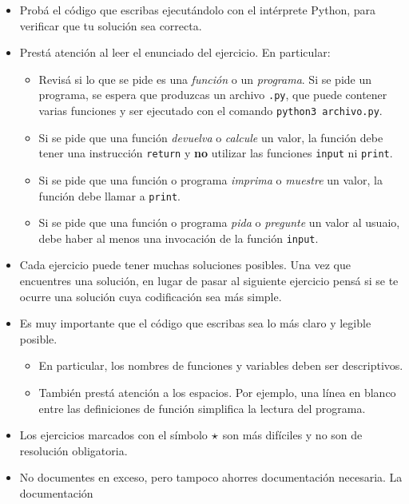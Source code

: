 \documentclass[11pt,spanish,a4paper,twoside,openany]{book}
\newcommand{\dificil}{\mathlarger{\mathlarger{\star}}}
\theoremstyle{definition}
\theoremstyle{definition}
\theoremstyle{remark}
\begin{document}
\begin{extract}
\begin{itemize}
	\item Probá el código que escribas ejecutándolo con el intérprete Python,
        para verificar que tu solución sea correcta.
	\item Prestá atención al leer el enunciado del ejercicio. En particular:
    \begin{itemize}
        \item Revisá si lo que se pide es una \emph{función} o un
            \emph{programa}. Si se pide un programa, se espera que produzcas
            un archivo \verb|.py|, que puede contener varias
            funciones y ser ejecutado con el comando \verb|python3 archivo.py|.
        \item Si se pide que una función \emph{devuelva} o \emph{calcule}
            un valor, la función debe tener una instrucción
            \verb|return| y {\bf no} utilizar las funciones \verb|input| ni
            \verb|print|.
        \item Si se pide que una función o programa \emph{imprima} o
            \emph{muestre} un valor, la función debe llamar a \verb|print|.
        \item Si se pide que una función o programa \emph{pida} o
            \emph{pregunte} un valor al usuaio, debe haber al menos una
            invocación de la función \verb|input|.
    \end{itemize}
    \item Cada ejercicio puede tener muchas soluciones posibles. Una vez que
        encuentres una solución, en lugar de pasar al siguiente ejercicio pensá
        si se te ocurre una solución cuya codificación sea más simple.
	\item Es muy importante que el código que escribas sea lo más claro y legible posible.
    \begin{itemize}
	    \item En particular, los nombres de funciones y variables deben ser descriptivos.
	    \item También prestá atención a los espacios. Por ejemplo, una línea en
            blanco entre las definiciones de función simplifica la lectura del programa.
    \end{itemize}
	\item Los ejercicios marcados con el símbolo $\dificil$ son más difíciles y no son de resolución obligatoria.
	\item No documentes en exceso, pero tampoco ahorres documentación necesaria. La documentación

\end{itemize}
\end{extract}
\end{document}
